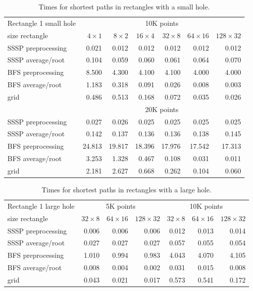 \documentclass[a4paper,USenglish]{lipics}
\begin{document}
\begin{table}
\begin{tabular}{l*{6}{r}}
Rectangle 1 small hole & \multicolumn{6}{c}{10K points}\\						
size rectangle	&	$4\times 1$	&	$8\times 2$	&	$16\times 4$	&	$32\times 8$	&	$64\times 16$	&	$128\times 32$	\\
\hline
SSSP preprocessing	&	0.021	&	0.012	&	0.012	&	0.012	&	0.012	&	0.012	\\
SSSP average/root	&	0.104	&	0.059	&	0.060	&	0.061	&	0.064	&	0.070	\\
BFS preprocessing	&	8.500	&	4.300	&	4.100	&	4.100	&	4.000	&	4.000	\\
BFS average/root	&	1.183	&	0.318	&	0.091	&	0.026	&	0.008	&	0.003	\\
grid	&	0.486	&	0.513	&	0.168	&	0.072	&	0.035	&	0.026\vspace{.2cm}	\\
\hline
  & \multicolumn{6}{c}{20K points}\\						
\hline
SSSP preprocessing	&	0.027	&	0.026	&	0.025	&	0.025	&	0.025	&	0.025	\\
SSSP average/root	&	0.142	&	0.137	&	0.136	&	0.136	&	0.138	&	0.145	\\
BFS preprocessing	&	24.813	&	19.817	&	18.396	&	17.976	&	17.542	&	17.313	\\
BFS average/root	&	3.253	&	1.328	&	0.467	&	0.108	&	0.031	&	0.011	\\
grid				&	2.181	&	2.627	&	0.668	&	0.262	&	0.104	&	0.060	
\end{tabular}
\caption{Times for shortest paths in rectangles with a small hole.}
\label{table2}
\end{table}


\begin{table}
\begin{tabular}{l*{3}{r}|*{3}{r}}
Rectangle 1 large hole & \multicolumn{3}{c|}{5K points} & \multicolumn{3}{c}{10K points}\\
size rectangle	&	$32\times 8$	&	$64\times 16$	&	$128\times 32$	&	$32\times 8$	&	$64\times 16$	&	$128\times 32$\\						
\hline
SSSP preprocessing	&	0.006	&	0.006	&	0.006	&	0.012	&	0.013	&	0.014	\\
SSSP average/root	&	0.027	&	0.027	&	0.027	&	0.057	&	0.055	&	0.054	\\
BFS preprocessing	&	1.010	&	0.994	&	0.983	&	4.043	&	4.070	&	4.105	\\
BFS average/root	&	0.008	&	0.004	&	0.002	&	0.031	&	0.015	&	0.008	\\
grid				&	0.043	&	0.021	&	0.017	&	0.573	&	0.541	&	0.172
\end{tabular}
\caption{Times for shortest paths in rectangles with a large hole.}
\label{table3}
\end{table}
\end{document}
